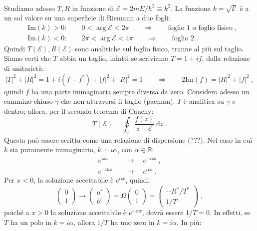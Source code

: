 \documentclass[12pt,a4paper]{report}
\theoremstyle{definition}
\numberwithin{equation}{section}
\newcommand{\diff}[1][]{\mathrm{d}#1}
\begin{document}
\\
Studiamo adesso $T,R$ in funzione di $\mathcal{E}=2mE/\hbar^2\equiv k^2$. La funzione $k=\sqrt{\mathcal{E}}$ è a un sol valore su una superficie di Riemann a due fogli:
\begin{align*}
&\mathrm{Im}(k)>0: \qquad 0<\arg\mathcal{E}<2\pi \qquad \Longrightarrow \qquad \mbox{foglio 1 o foglio fisico}\;, \\
&\mathrm{Im}(k)<0: \qquad 2\pi<\arg\mathcal{E}<4\pi \qquad \Longrightarrow \qquad \mbox{foglio 2}\;.
\end{align*}
Quindi $T(\mathcal{E}),R(\mathcal{E})$ sono analitiche sul foglio fisico, tranne al più sul taglio. Siamo certi che $T$ abbia un taglio, infatti se scriviamo $T=1+if$, dalla relazione di unitarietà:
\begin{equation}
|T|^2+|R|^2=1+i(f-f^*)+|f|^2+|R|^2=1 \qquad \Longrightarrow \qquad 2\mathrm{Im}(f)=|R|^2+|f|^2\;,
\end{equation}
quindi $f$ ha una parte immaginaria sempre diversa da zero. Considero adesso un cammino chiuso $\gamma$ che non attraversi il taglio (pacman). $T$ è analitica su $\gamma$ e dentro; allora, per il secondo teorema di Cauchy:
\begin{equation}
T(\mathcal{E})=\oint_{\gamma} \frac{f(z)}{z-\mathcal{E}}\;\diff{z}\;.
\end{equation}
Questa può essere scritta come una relazione di dispersione (???). Nel caso in cui $k$ sia puramente immaginario, $k=i\alpha$, con $\alpha\in\mathbb{R}$:
\begin{align*}
e^{ikx}\quad &\longrightarrow \quad e^{-\alpha x}\;, \\
e^{-ikx}\quad &\longrightarrow \quad e^{\alpha x}\;.
\end{align*}
Per $x<0$, la soluzione accettabile è $e^{\alpha x}$, quindi:
$$
\left(\begin{matrix}
0 \\
1
\end{matrix}\right) \longrightarrow \left(
\begin{matrix}
a' \\
b'
\end{matrix}\right)=\Omega\left(\begin{matrix}
0 \\
1
\end{matrix}\right)=\left(\begin{matrix}
-R^*/T^* \\
1/T
\end{matrix}\right)\;,
$$
poiché a $x>0$ la soluzione accettabile è $e^{-\alpha x}$, dovrà essere $1/T=0$. In effetti, se $T$ ha un polo in $k=i\alpha$, allora $1/T$ ha uno zero in $k=i\alpha$. In più:
\end{document}
